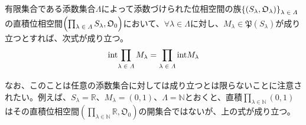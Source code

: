 \documentclass[dvipdfmx]{jsarticle}
\begin{document}
\begin{thm}\label{8.1.4.21}
有限集合である添数集合$\varLambda$によって添数づけられた位相空間の族$\left\{ \left( S_{\lambda},\mathfrak{O}_{\lambda} \right) \right\}_{\scriptsize \begin{matrix}
\lambda \in \varLambda \\
\end{matrix}}$の直積位相空間$\left( \prod_{\scriptsize \begin{matrix}
\lambda \in \varLambda \\
\end{matrix}} S_{\lambda},\mathfrak{O}_{0} \right)$において、$\forall\lambda \in \varLambda$に対し、$M_{\lambda}\in \mathfrak{P}\left( S_{\lambda} \right)$が成り立つとすれば、次式が成り立つ。
\begin{align*}
{\mathrm{int}}{\prod_{\scriptsize \begin{matrix}
\lambda \in \varLambda \\
\end{matrix}} M_{\lambda}} = \prod_{\scriptsize \begin{matrix}
\lambda \in \varLambda \\
\end{matrix}} {{\mathrm{int}}M_{\lambda}}
\end{align*}
\end{thm}\par
なお、このことは任意の添数集合に対しては成り立つとは限らないことに注意されたい。例えば、$S_{\lambda} = \mathbb{R}$、$M_{\lambda} = (0,1)$、$\varLambda = \mathbb{N}$とおくと、直積$\prod_{\lambda \in \mathbb{N}} (0,1)$はその直積位相空間$\left( \prod_{\lambda \in \mathbb{N}} \mathbb{R},\mathfrak{O}_{0} \right)$の開集合ではないが、上の式が成り立つ。
\end{document}
